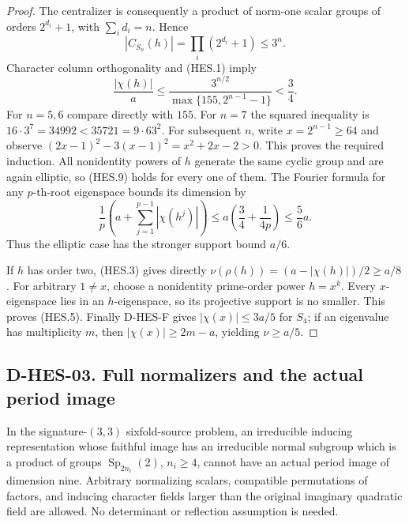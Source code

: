 \begin{proof}
The centralizer is consequently a product of norm-one scalar groups of
orders $2^{d_i}+1$, with $\sum_i d_i=n$. Hence
\[
                   |C_{S_n}(h)|=\prod_i(2^{d_i}+1)\le3^n.
\tag{HES.8}
\]
Character column orthogonality and (HES.1) imply
\[
        \frac{|\chi(h)|}{a}
        \le\frac{3^{n/2}}{\max\{155,2^{n-1}-1\}}<\frac34.
\tag{HES.9}
\]
For $n=5,6$ compare directly with $155$. For $n=7$ the squared inequality
is $16\cdot3^7=34992<35721=9\cdot63^2$.
For subsequent $n$, write $x=2^{n-1}\ge64$ and observe
$(2x-1)^2-3(x-1)^2=x^2+2x-2>0$. This proves the required induction.
All nonidentity powers of $h$ generate the same cyclic group and are
again elliptic, so (HES.9) holds for every one of them. The Fourier
formula for any $p$-th-root eigenspace bounds its dimension by
\[
             \frac1p\left(a+\sum_{j=1}^{p-1}|\chi(h^j)|\right)
                 \le a\left(\frac34+\frac1{4p}\right)\le\frac56a.
\]
Thus the elliptic case has the stronger support bound $a/6$.

If $h$ has order two, (HES.3) gives directly
$\nu(\rho(h))=(a-|\chi(h)|)/2\ge a/8$.
For arbitrary $1\ne x$, choose a nonidentity prime-order power $h=x^k$.
Every $x$-eigenspace lies in an $h$-eigenspace, so its projective support
is no smaller. This proves (HES.5). Finally D-HES-F gives
$|\chi(x)|\le3a/5$ for $S_4$; if an eigenvalue has multiplicity $m$, then
$|\chi(x)|\ge2m-a$, yielding $\nu\ge a/5$.
\end{proof}

\subsection*{D-HES-03. Full normalizers and the actual period image}

\begin{theorem}
In the signature-$(3,3)$ sixfold-source problem, an irreducible inducing
representation whose faithful image has an irreducible normal subgroup
which is a product of groups $\operatorname{Sp}_{2n_i}(2)$, $n_i\ge4$,
cannot have an actual period image of dimension nine. Arbitrary
normalizing scalars, compatible permutations of factors, and inducing
character fields larger than the original imaginary quadratic field are
allowed. No determinant or reflection assumption is needed.
\end{theorem}

